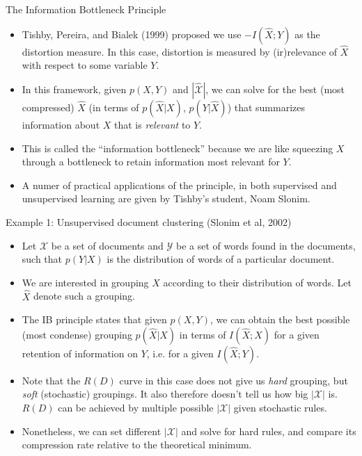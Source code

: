 \documentclass{beamer}
\begin{document}
\begin{frame}{The Information Bottleneck Principle}
\begin{itemize}
	\item Tishby, Pereira, and Bialek (1999) proposed we use $-I(\hat{X}; Y)$ as the distortion measure. In this case, distortion is measured by (ir)relevance of $\hat{X}$ with respect to some variable $Y$. 
	\item In this framework, given $p(X,Y)$ and $|\hat{\mathcal{X}}|$, we can solve for the best (most compressed) $\hat{X}$ (in terms of $p(\hat{X}|X)$, $p(Y|\hat{X})$) that summarizes information about $X$ that is \emph{relevant} to $Y$. 
	\item This is called the ``information bottleneck'' because we are like squeezing $X$ through a bottleneck to retain information most relevant for $Y$. 
	\item A numer of practical applications of the principle, in both supervised and unsupervised learning are given by Tishby's student, Noam Slonim. 
\end{itemize}
\end{frame}

\begin{frame}{Example 1: Unsupervised document clustering (Slonim et al, 2002)}
\begin{itemize}
	\item Let $\mathcal{X}$ be a set of documents and $\mathcal{Y}$ be a set of words found in the documents, such that $p(Y|X)$ is the distribution of words of a particular document. 
	\item We are interested in grouping $X$ according to their distribution of words. Let $\hat{X}$ denote such a grouping.
	\item The IB principle states that given $p(X,Y)$, we can obtain the best possible (most condense) grouping $p(\hat{X}|X)$ in terms of $I(\hat{X};X)$ for a given retention of information on $Y$, i.e. for a given $I(\hat{X};Y)$. 
	\item Note that the $R(D)$ curve in this case does not give us \emph{hard} grouping, but \emph{soft} (stochastic) groupings. It also therefore doesn't tell us how big $|\mathcal{X}|$ is. $R(D)$ can be achieved by multiple possible $|\mathcal{X}|$ given stochastic rules. 
	\item Nonetheless, we can set different $|\mathcal{X}|$ and solve for hard rules, and compare its compression rate relative to the theoretical minimum. 
\end{itemize}
\end{frame}
\end{document}
